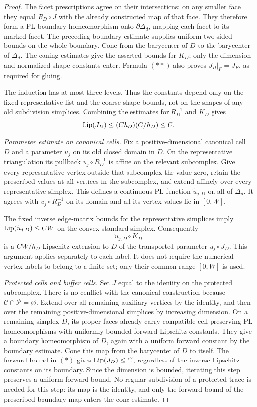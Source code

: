 \begin{proof}
The facet prescriptions agree on their intersections: on any
smaller face they equal $R_D\circ J$ with the already constructed
map of that face.  They therefore form a PL boundary homeomorphism
onto $\partial\Delta_d$, mapping each facet to its marked facet.
The preceding boundary estimate supplies uniform two-sided bounds
on the whole boundary.  Cone from the barycenter of $D$ to the
barycenter of $\Delta_d$.  The coning estimates give the asserted
bounds for $K_D$; only the dimension and normalized shape constants
enter.  Formula $(**)$ also proves
$J_D|_F=J_F$, as required for gluing.

The induction has at most three levels.  Thus the constants depend
only on the fixed representative list and the coarse shape bounds,
not on the shapes of any old subdivision simplices.  Combining
the estimates for $R_D^{-1}$ and $K_D$ gives
\[
 \operatorname{Lip}(J_D)\leq (C h_D)(C/h_D)\leq C.
\]

\emph{Parameter estimate on canonical cells.}
Fix a positive-dimensional canonical cell $D$ and a parameter $u_j$
on its old closed domain in $D$.  On the
representative triangulation its pullback $u_j\circ R_D^{-1}$
is affine on the relevant subcomplex.  Give every representative
vertex outside that subcomplex the value zero, retain the
prescribed values at all vertices in the subcomplex, and extend
affinely over every representative simplex.  This defines a
continuous PL function $\widetilde u_{j,D}$ on all of $\Delta_d$.
It agrees with $u_j\circ R_D^{-1}$ on its domain and all its vertex
values lie in $[0,W]$.

The fixed inverse edge-matrix bounds for the representative
simplices imply
$\operatorname{Lip}(\widetilde u_{j,D})\leq C W$ on the convex standard simplex.
Consequently
\[
 \widetilde u_{j,D}\circ K_D
\]
is a $C W/h_D$-Lipschitz extension to $D$ of the transported
parameter $u_j\circ J_D$.  This argument applies separately to
each label.  It does not require the numerical vertex labels to
belong to a finite set; only their common range $[0,W]$ is used.

\emph{Protected cells and buffer cells.}
Set $J$ equal to the identity on the protected subcomplex.
There is no conflict with the canonical construction because
$\mathcal C\cap\mathcal P=\varnothing$.  Extend over all remaining
auxiliary vertices by the identity, and then over the remaining
positive-dimensional simplices by increasing dimension.  On a remaining
simplex $D$, its proper faces already carry compatible
cell-preserving PL homeomorphisms with uniformly bounded forward
Lipschitz constants.  They give a boundary homeomorphism of $D$,
again with a uniform forward constant by the boundary estimate.
Cone this map from the barycenter of $D$ to itself.  The forward
bound in $(*)$ gives $\operatorname{Lip}(J_D)\leq C$, regardless of the inverse
Lipschitz constants on its boundary.  Since the dimension is
bounded, iterating this step preserves a uniform forward bound.
No regular subdivision of a protected trace is needed for this
step: its map is the identity, and only the forward bound of the
prescribed boundary map enters the cone estimate.


\end{proof}
